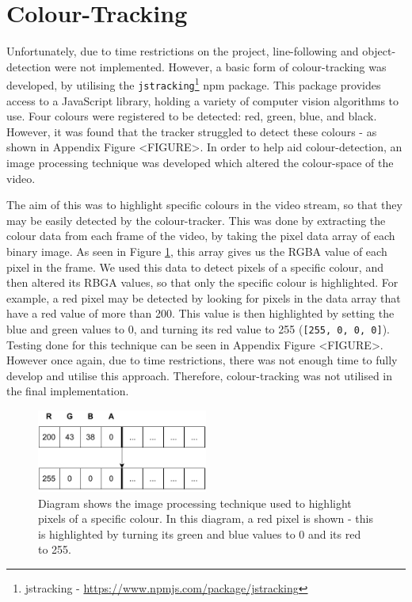 \documentclass{l4proj}
\begin{document}
\section{Colour-Tracking}
Unfortunately, due to time restrictions on the project, line-following and object-detection were not implemented. However, a basic form of colour-tracking was developed, by utilising the \lstinline{jstracking}\footnote{jstracking - \url{https://www.npmjs.com/package/jstracking}} npm package. This package provides access to a JavaScript library, holding a variety of computer vision algorithms to use. Four colours were registered to be detected: red, green, blue, and black. However, it was found that the tracker struggled to detect these colours - as shown in Appendix Figure <FIGURE>. In order to help aid colour-detection, an image processing technique was developed which altered the colour-space of the video.

The aim of this was to highlight specific colours in the video stream, so that they may be easily detected by the colour-tracker. This was done by extracting the colour data from each frame of the video, by taking the pixel data array of each binary image. As seen in Figure \ref{fig:image-processing}, this array gives us the RGBA value of each pixel in the frame. We used this data to detect pixels of a specific colour, and then altered its RBGA values, so that only the specific colour is highlighted. For example, a red pixel may be detected by looking for pixels in the data array that have 
a red value of more than 200. This value is then highlighted by setting the blue and green values to 0, and turning its red value to 255 (\lstinline{[255, 0, 0, 0]}). Testing done for this technique can be seen in Appendix Figure <FIGURE>. However once again, due to time restrictions, there was not enough time to fully develop and utilise this approach. Therefore, colour-tracking was not utilised in the final implementation.

\begin{figure}
    \centering
    \includegraphics[width=0.5\textwidth]{images/image-processing.pdf}
    \caption{Diagram shows the image processing technique used to highlight pixels of a specific colour. In this diagram, a red pixel is shown - this is highlighted by turning its green and blue values to 0 and its red to 255.}
    \label{fig:image-processing}
\end{figure}
\end{document}
